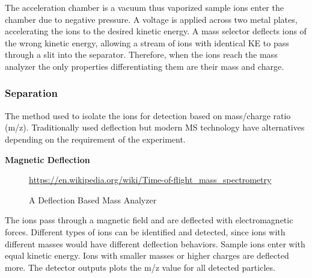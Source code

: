 \documentclass[letterpaper, 10 pt, conference]{ieeeconf}  %
\begin{document}
        The acceleration chamber is a vacuum thus vaporized sample ions enter the chamber due to negative pressure. A voltage is applied across two metal plates, accelerating the ions to the desired kinetic energy. A mass selector deflects ions of the wrong kinetic energy, allowing a stream of ions with identical KE to pass through a slit into the separator. Therefore, when the ions reach the mass analyzer the only properties differentiating them are their mass and charge.

        \subsubsection{\textbf{Separation}}\hfill

        The method used to isolate the ions for detection based on mass/charge ratio (m/z). Traditionally used deflection but modern MS technology have alternatives depending on the requirement of the experiment.
        
            \textbf{Magnetic Deflection\autocite{R7}}\hfill

            \begin{figure}[h]
                \centering

                \caption{A Deflection Based Mass Analyzer}
                \tiny{\url{https://en.wikipedia.org/wiki/Time-of-flight_mass_spectrometry}}

            \end{figure}

            The ions pass through a magnetic field and are deflected with electromagnetic forces. Different types of ions can be identified and detected, since ions with different masses would have different deflection behaviors. Sample ions enter with equal kinetic energy. Ions with smaller masses or higher charges are deflected more. The detector outputs plots the m/z value for all detected particles.
\end{document}
